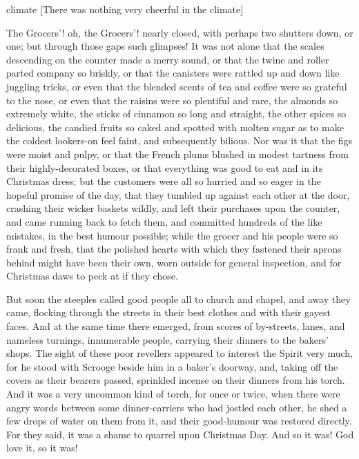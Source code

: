 \begin{bwbigpic}
	[\basicscale]
	{climate}
	[There was nothing very cheerful in the climate]
\end{bwbigpic}

The Grocers'! oh, the Grocers'! nearly closed, with perhaps two shutters down, or one; but through those gaps such glimpses! It was not alone that the scales descending on the counter made a merry sound, or that the twine and roller parted company so briskly, or that the canisters were rattled up and down like juggling tricks, or even that the blended scents of tea and coffee were so grateful to the nose, or even that the raisins were so plentiful and rare, the almonds so extremely white, the sticks of cinnamon so long and straight, the other spices so delicious, the candied fruits so caked and spotted with molten sugar as to make the coldest lookers-on feel faint, and subsequently bilious. Nor was it that the figs were moist and pulpy, or that the French plums blushed in modest tartness from their highly-decorated boxes, or that every\-thing was good to eat and in its Christmas dress; but the customers were all so hurried and so eager in the hopeful promise of the day, that they tumbled up against each other at the door, crashing their wicker baskets wildly, and left their purchases upon the counter, and came running back to fetch them, and committed hundreds of the like mistakes, in the best humour possible; while the grocer and his people were so frank and fresh, that the polished hearts with which they fastened their aprons behind might have been their own, worn outside for general inspection, and for Christmas daws to peck at if they chose.


But soon the steeples called good people all to church and chap\-el, and away they came, flocking through the streets in their best  clothes and with their gayest faces. And at the same time there emerged, from scores of by-streets, lanes, and nameless turnings, innumerable people, carrying their dinners to the bakers' shops. The sight of these poor revellers appeared to interest the Spirit very much, for he stood with Scrooge beside him in a baker's doorway, and, taking off the covers as their bearers passed, sprin\-kled incense on their dinners from his torch. And it was a very uncommon kind of torch, for once or twice, when there were angry words between some dinner-carriers who had jostled each other, he shed a few drops of water on them from it, and their good-humour was restored directly. For they said, it was a shame to quarrel upon Christmas Day. And so it was! God love it, so it was!

